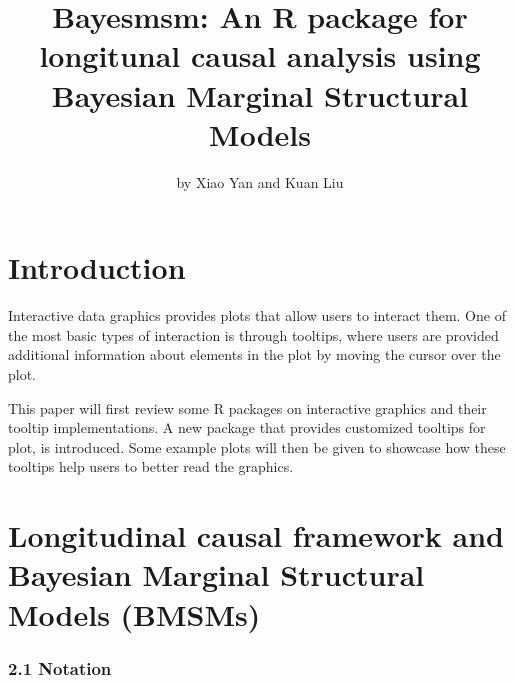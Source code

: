 \title{Bayesmsm: An R package for longitunal causal analysis using Bayesian Marginal Structural Models}


\author{by Xiao Yan and Kuan Liu}

\maketitle


\section{Introduction}\label{introduction}

Interactive data graphics provides plots that allow users to interact them. One of the most basic types of interaction is through tooltips, where users are provided additional information about elements in the plot by moving the cursor over the plot.

This paper will first review some R packages on interactive graphics and their tooltip implementations. A new package  that provides customized tooltips for plot, is introduced. Some example plots will then be given to showcase how these tooltips help users to better read the graphics.

\section{Longitudinal causal framework and Bayesian Marginal Structural Models (BMSMs)}\label{longitudinal-causal-framework-and-bayesian-marginal-structural-models-bmsms}

\subsubsection{2.1 Notation}\label{notation}

